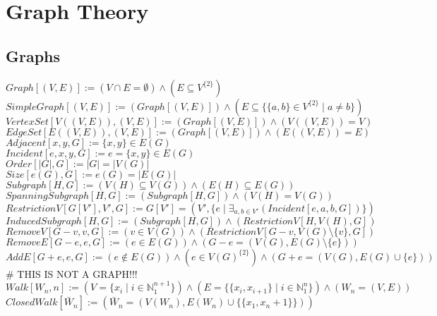 \documentclass{book}
\newcommand{\abr}{:=}
\newcommand{\setbackgroundcolour}{\pagecolor[rgb]{0.2,0.2,0.2}}
\newcommand{\settextcolour}{\color[rgb]{0.8,0.8,0.8}}
\newcommand{\invertbackgroundtext}{\setbackgroundcolour\settextcolour}
\newcommand{\st}{\mathbin{|}}
\begin{document}
\invertbackgroundtext
\setlength{\parindent}{0pt}

\tableofcontents

\chapter{Graph Theory}
\section{Graphs}
$Graph[(V, E)] \abr (V \cap E = \emptyset) \land (E \subseteq V^{\{2\}})$ \\
$SimpleGraph[(V, E)] \abr (Graph[(V, E)]) \land (E \subseteq \{\{a, b\} \in V^{\{2\}} \st a \neq b\})$ \\
$VertexSet[V((V, E)), (V, E)] \abr (Graph[(V, E)]) \land (V((V, E)) = V)$ \\
$EdgeSet[E((V, E)), (V, E)] \abr (Graph[(V, E)]) \land (E((V, E)) = E)$ \\
$Adjacent[x, y, G] \abr \{x, y\} \in E(G)$ \\
$Incident[e, x, y, G] \abr e = \{x, y\} \in E(G)$ \\
$Order[|G|, G] \abr |G| = |V(G)|$ \\
$Size[e(G), G] \abr e(G) = |E(G)|$ \\

$Subgraph[H, G] \abr (V(H) \subseteq V(G)) \land (E(H) \subseteq E(G))$ \\
$SpanningSubgraph[H, G] \abr (Subgraph[H, G]) \land (V(H) = V(G))$ \\
$RestrictionV[G[V'], V', G] \abr G[V'] = (V', \{e \st \exists_{a, b \in V'}(Incident[e, a, b, G])\})$ \\
$InducedSubgraph[H, G] \abr (Subgraph[H, G]) \land (RestrictionV[H, V(H), G])$ \\
$RemoveV[G - v, v, G] \abr (v \in V(G)) \land (RestrictionV[G - v, V(G) \setminus \{v\}, G])$ \\
$RemoveE[G - e, e, G] \abr (e \in E(G)) \land (G - e = (V(G), E(G) \setminus \{e\}))$ \\
$AddE[G + e, e, G] \abr (e \notin E(G)) \land (e \in V(G)^{\{2\}}) \land (G + e = (V(G), E(G) \cup \{e\}))$ \\

# THIS IS NOT A GRAPH!!!
$Walk[W_n, n] \abr (V = \{x_i \st i \in \mathbb{N}_1^{n + 1}\}) \land (E = \{\{x_i, x_{i+1}\} \st i \in \mathbb{N}_1^n\}) \land (W_n = (V, E))$ \\
$ClosedWalk[\bar{W}_n] \abr (\bar{W}_n = (V(W_n), E(W_n) \cup \{\{x_1, x_n+1\}\}))$ \\
\end{document}
